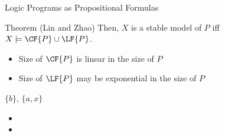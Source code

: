 \begin{frame}[t]{Logic Programs as Propositional Formulas}
{\begin{minipage}[b][10cm][t]{\textwidth}
{\begin{beamerboxesrounded}[upper=block title, lower=block body]{Theorem (Lin and Zhao)}
Then, $X$ is a stable model of $P$ iff $X\models\CF{P}\cup\LF{P}$.
\end{beamerboxesrounded}
\begin{itemize}
  \item Size of $\CF{P}$ is \alert{linear} in the size of $P$
  \item Size of $\LF{P}$ may be \alert{exponential} in the size of $P$~\nocite{lifraz04a}
\end{itemize}
}{
$\{b\}$,
$\{a,x\}$
\medskip
\begin{itemize}
 \item<3-> 
 \item<5-> 
\end{itemize}
}
\end{minipage}
}
\end{frame}
%
%
